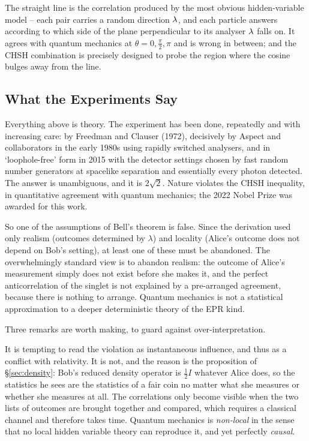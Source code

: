 \documentclass[a4paper]{scrartcl}
\newcommand{\half}{\tfrac{1}{2}}
\begin{document}
The straight line is the correlation produced by the most obvious hidden-variable model -- each pair carries a random direction $\mathbf{\lambda}$, and each particle answers according to which side of the plane perpendicular to its analyser $\mathbf{\lambda}$ falls on. It agrees with quantum mechanics at $\theta = 0, \frac\pi2, \pi$ and is wrong in between; and the CHSH combination is precisely designed to probe the region where the cosine bulges away from the line.

\subsection{What the Experiments Say}

Everything above is theory. The experiment has been done, repeatedly and with increasing care: by Freedman and Clauser (1972), decisively by Aspect and collaborators in the early 1980s using rapidly switched analysers, and in `loophole-free' form in 2015 with the detector settings chosen by fast random number generators at spacelike separation and essentially every photon detected. The answer is unambiguous, and it is $2\sqrt2$. Nature violates the CHSH inequality, in quantitative agreement with quantum mechanics; the 2022 Nobel Prize was awarded for this work.

So one of the assumptions of Bell's theorem is false. Since the derivation used only realism (outcomes determined by $\lambda$) and locality (Alice's outcome does not depend on Bob's setting), at least one of these must be abandoned. The overwhelmingly standard view is to abandon realism: the outcome of Alice's measurement simply does not exist before she makes it, and the perfect anticorrelation of the singlet is not explained by a pre-arranged agreement, because there is nothing to arrange. Quantum mechanics is not a statistical approximation to a deeper deterministic theory of the EPR kind.

Three remarks are worth making, to guard against over-interpretation.

\begin{remark}
    It is tempting to read the violation as instantaneous influence, and thus as a conflict with relativity. It is not, and the reason is the proposition of \S\ref{sec:density}: Bob's reduced density operator is $\half I$ whatever Alice does, so the statistics he sees are the statistics of a fair coin no matter what she measures or whether she measures at all. The correlations only become visible when the two lists of outcomes are brought together and compared, which requires a classical channel and therefore takes time. Quantum mechanics is \emph{non-local} in the sense that no local hidden variable theory can reproduce it, and yet perfectly \emph{causal}.
\end{remark}
\end{document}
